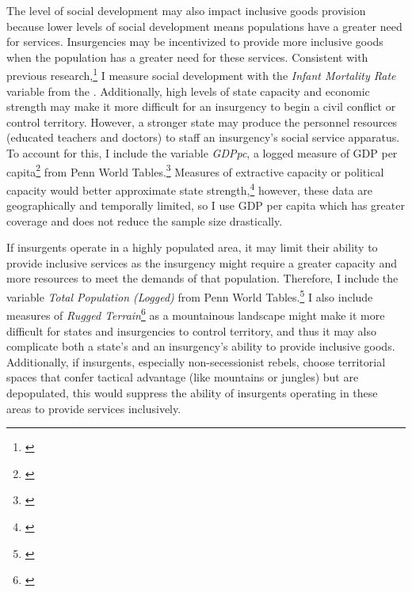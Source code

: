 \documentclass[12pt, letterpaper]{article}
\begin{document}
The level of social development may also impact inclusive goods provision because lower levels of social development means populations have a greater need for services. Insurgencies may be incentivized to provide more inclusive goods when the population has a greater need for these services. Consistent with previous research,\footnote{\citealt{girod2012effective}} I measure social development with the \textit{Infant Mortality Rate} variable from the \citet{world2012}. Additionally, high levels of state capacity and economic strength may make it more difficult for an insurgency to begin a civil conflict or control territory. However, a stronger state may produce the personnel resources (educated teachers and doctors) to staff an insurgency's social service apparatus. To account for this, I include the variable \textit{GDPpc}, a logged measure of GDP per capita\footnote{\citealt{fearon2003ethnicity}} from Penn World Tables.\footnote{\citealt{heston2002penn}} Measures of extractive capacity or political capacity would better approximate state strength,\footnote{\citealt{hendrix2010measuring}} however, these data are geographically and temporally limited, so I use GDP per capita which has greater coverage and does not reduce the sample size drastically. 


If insurgents operate in a highly populated area, it may limit their ability to provide inclusive services as the insurgency might require a greater capacity and more resources to meet the demands of that population. Therefore, I include the variable \textit{Total Population (Logged)} from Penn World Tables.\footnote{\citealt{heston2002penn}} I also include measures of \textit{Rugged Terrain}\footnote{\citealt{fearon2003ethnicity}} as a mountainous landscape might make it more difficult for states and insurgencies to control territory, and thus it may also complicate both a state's and an insurgency's ability to provide inclusive goods. Additionally, if insurgents, especially non-secessionist rebels, choose territorial spaces that confer tactical advantage (like mountains or jungles) but are depopulated, this would suppress the ability of insurgents operating in these areas to provide services inclusively. 
\end{document}
